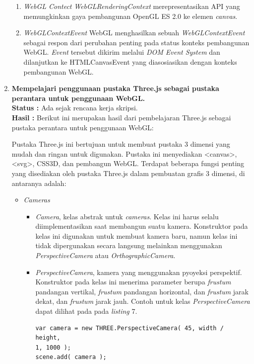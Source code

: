 \documentclass[a4paper,twoside]{article}
\begin{document}
\begin{enumerate}
\begin{enumerate}
\item {\it WebGL Contect}
	{\it WebGLRenderingContext} merepresentasikan API yang memungkinkan gaya pembangunan OpenGL ES 2.0 ke elemen {\it canvas}.

\item {\it WebGLContextEvent}
	WebGL menghasilkan sebuah {\it WebGLContextEvent} sebagai respon dari perubahan penting pada status konteks pembangunan WebGL. {\it Event} tersebut dikirim melalui {\it DOM Event System} dan dilanjutkan ke HTMLCanvasEvent yang diasosiasikan dengan konteks pembangunan WebGL.

\end{enumerate}
		
		\item \textbf{Mempelajari penggunaan pustaka Three.js sebagai pustaka perantara untuk penggunaan WebGL.}\\
		{\bf Status :} Ada sejak rencana kerja skripsi.\\
		{\bf Hasil :} Berikut ini merupakan hasil dari pembelajaran Three.js sebagai pustaka perantara untuk penggunaan WebGL:
		
Pustaka Three.js ini bertujuan untuk membuat pustaka 3 dimensi yang mudah dan ringan untuk digunakan. Pustaka ini menyediakan <canvas>, <svg>, CSS3D, dan pembangun WebGL.
Terdapat beberapa fungsi penting yang disediakan oleh pustaka Three.js dalam pembuatan grafis 3 dimensi, di antaranya adalah:
\begin{itemize}

\item \textit{Cameras}

	\begin{itemize}
	\item {\it Camera}, kelas abstrak untuk {\it cameras}. Kelas ini harus selalu diimplementasikan saat membangun suatu kamera. Konstruktor pada kelas ini digunakan untuk membuat kamera baru, namun kelas ini tidak dipergunakan secara langsung melainkan menggunakan {\it PerspectiveCamera} atau {\it OrthographicCamera}.
	
	\item {\it PerspectiveCamera}, kamera yang menggunakan pyoyeksi perspektif. Konstruktor pada kelas ini menerima parameter berupa {\it frustum} pandangan vertikal, {\it frustum} pandangan horizontal, dan {\it frustum} jarak dekat, dan {\it frustum} jarak jauh. Contoh untuk kelas {\it PerspectiveCamera} dapat dilihat pada pada {\it listing} 7.
\begin{lstlisting}[caption={Contoh instansiasi kelas {\it PerspectiveCamera}},captionpos=b]
var camera = new THREE.PerspectiveCamera( 45, width / height, 
1, 1000 );
scene.add( camera );
\end{lstlisting}
	\end{itemize}


\end{itemize}
\end{enumerate}
\end{document}
